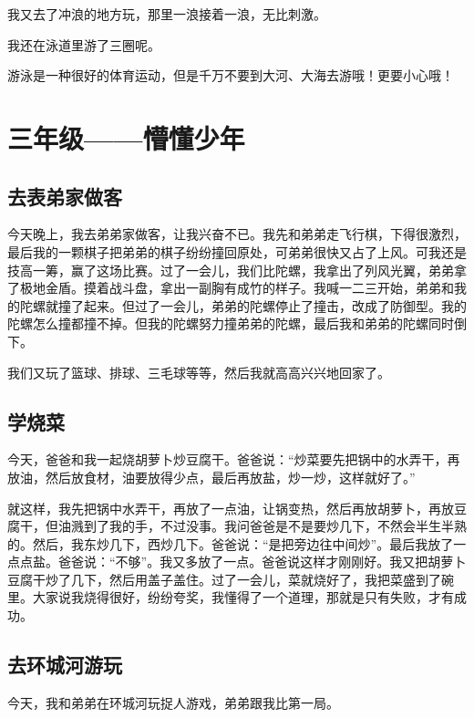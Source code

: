 \documentclass[UTF8,a4paper,titlepage,twoside,10.5pt]{article}
\begin{document}
我又去了冲浪的地方玩，那里一浪接着一浪，无比刺激。

我还在泳道里游了三圈呢。

游泳是一种很好的体育运动，但是千万不要到大河、大海去游哦！更要小心哦！

\newpage

\section{三年级——懵懂少年}
\label{sec:org984f97f}

\subsection{去表弟家做客}
\label{sec:org3617111}

今天晚上，我去弟弟家做客，让我兴奋不已。我先和弟弟走飞行棋，下得很激烈，最后我的一颗棋子把弟弟的棋子纷纷撞回原处，可弟弟很快又占了上风。可我还是技高一筹，赢了这场比赛。过了一会儿，我们比陀螺，我拿出了列风光翼，弟弟拿了极地金盾。摸着战斗盘，拿出一副胸有成竹的样子。我喊一二三开始，弟弟和我的陀螺就撞了起来。但过了一会儿，弟弟的陀螺停止了撞击，改成了防御型。我的陀螺怎么撞都撞不掉。但我的陀螺努力撞弟弟的陀螺，最后我和弟弟的陀螺同时倒下。

我们又玩了篮球、排球、三毛球等等，然后我就高高兴兴地回家了。

\subsection{学烧菜}
\label{sec:orge63e951}

今天，爸爸和我一起烧胡萝卜炒豆腐干。爸爸说：“炒菜要先把锅中的水弄干，再放油，然后放食材，油要放得少点，最后再放盐，炒一炒，这样就好了。”

就这样，我先把锅中水弄干，再放了一点油，让锅变热，然后再放胡萝卜，再放豆腐干，但油溅到了我的手，不过没事。我问爸爸是不是要炒几下，不然会半生半熟的。然后，我东炒几下，西炒几下。爸爸说：“是把旁边往中间炒”。最后我放了一点点盐。爸爸说：“不够”。我又多放了一点。爸爸说这样才刚刚好。我又把胡萝卜豆腐干炒了几下，然后用盖子盖住。过了一会儿，菜就烧好了，我把菜盛到了碗里。大家说我烧得很好，纷纷夸奖，我懂得了一个道理，那就是只有失败，才有成功。

\subsection{去环城河游玩}
\label{sec:org04453ca}

今天，我和弟弟在环城河玩捉人游戏，弟弟跟我比第一局。
\end{document}
